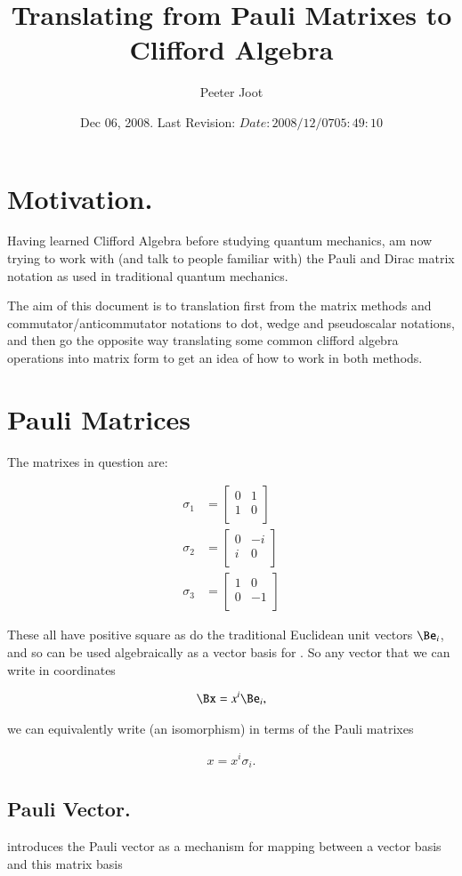 \documentclass{article}
\title{Translating from Pauli Matrixes to Clifford Algebra}
\author{Peeter Joot}
\date{ Dec 06, 2008.  Last Revision: $Date: 2008/12/07 05:49:10 $ }
\newcommand{\PauliX}[0]{
\begin{bmatrix}
0 & 1 \\
1 & 0 \\
\end{bmatrix}
}
\newcommand{\PauliY}[0]{
\begin{bmatrix}
0 & -i \\
i & 0 \\
\end{bmatrix}
}
\newcommand{\PauliZ}[0]{
\begin{bmatrix}
1 & 0 \\
0 & -1 \\
\end{bmatrix}
}
\begin{document}
\maketitle{}

\tableofcontents

\section{ Motivation. }

Having learned Clifford Algebra before studying quantum mechanics, am now trying to work with (and talk to people familiar with) the Pauli and Dirac matrix notation as used in
traditional quantum mechanics.

The aim of this document is to translation first from the matrix methods and commutator/anticommutator notations to dot, wedge and pseudoscalar notations, and then
go the opposite way translating some common clifford algebra operations into matrix form to get an idea of how to work in both methods.

\section{ Pauli Matrices }

The matrixes in question are:

\begin{align}
\sigma_1 &= \PauliX \\
\sigma_2 &= \PauliY \\
\sigma_3 &= \PauliZ
\end{align}

These all have positive square as do the traditional Euclidean unit vectors $\Be_i$, and so can be used algebraically as a vector basis for .  So any vector that we
can write in coordinates

\begin{align*}
\Bx = x^i \Be_i,
\end{align*}

we can equivalently write (an isomorphism) in terms of the Pauli matrixes

\begin{align}\label{eqn:vectorInPauliBasis}
x = x^i \sigma_i.
\end{align}

\subsection{ Pauli Vector. }
\cite{wikipauli} introduces the Pauli vector as a mechanism for mapping between a vector basis and this matrix basis
\end{document}
